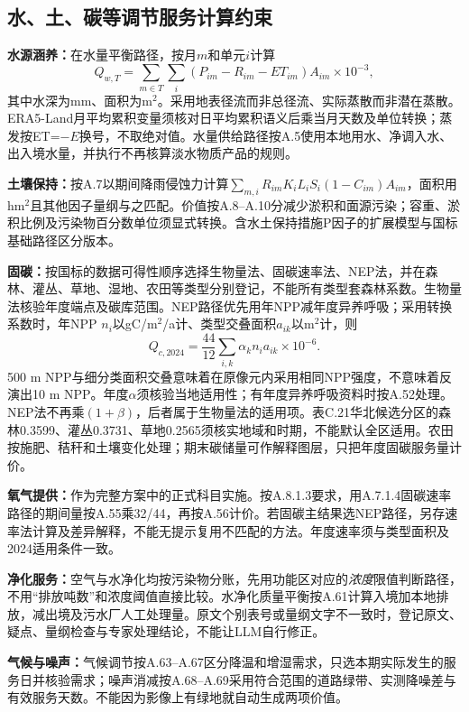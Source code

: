\documentclass[12pt,a4paper,fontset=fandol]{ctexart}
\begin{document}
\subsection{水、土、碳等调节服务计算约束}
\textbf{水源涵养：}在水量平衡路径，按月$m$和单元$i$计算
\begin{equation}
 Q_{w,T}=\sum_{m\in T}\sum_i(P_{im}-R_{im}-ET_{im})A_{im}\times10^{-3},
\end{equation}
其中水深为mm、面积为m$^2$。采用地表径流而非总径流、实际蒸散而非潜在蒸散。ERA5-Land月平均累积变量须核对日平均累积语义后乘当月天数及单位转换；蒸发按ET=$-E$换号，不取绝对值。水量供给路径按A.5使用本地用水、净调入水、出入境水量，并执行不再核算淡水物质产品的规则。

\textbf{土壤保持：}按A.7以期间降雨侵蚀力计算$\sum_{m,i}R_{im}K_iL_iS_i(1-C_{im})A_{im}$，面积用hm$^2$且其他因子量纲与之匹配。价值按A.8--A.10分减少淤积和面源污染；容重、淤积比例及污染物百分数单位须显式转换。含水土保持措施P因子的扩展模型与国标基础路径区分版本。

\textbf{固碳：}按国标的数据可得性顺序选择生物量法、固碳速率法、NEP法，并在森林、灌丛、草地、湿地、农田等类型分别登记，不能所有类型套森林系数。生物量法核验年度端点及碳库范围。NEP路径优先用年NPP减年度异养呼吸；采用转换系数时，年NPP $n_i$以gC/m$^2$/a计、类型交叠面积$a_{ik}$以m$^2$计，则
\begin{equation}
 Q_{c,2024}=\frac{44}{12}\sum_{i,k}\alpha_k n_i a_{ik}\times10^{-6}.
\end{equation}
500 m NPP与细分类面积交叠意味着在原像元内采用相同NPP强度，不意味着反演出10 m NPP。年度$\alpha$须核验当地适用性；有年度异养呼吸资料时按A.52处理。NEP法不再乘$(1+\beta)$，后者属于生物量法的适用项。表C.21华北候选分区的森林0.3599、灌丛0.3731、草地0.2565须核实地域和时期，不能默认全区适用。农田按施肥、秸秆和土壤变化处理；期末碳储量可作解释图层，只把年度固碳服务量计价。

\textbf{氧气提供：}作为完整方案中的正式科目实施。按A.8.1.3要求，用A.7.1.4固碳速率路径的期间量按A.55乘32/44，再按A.56计价。若固碳主结果选NEP路径，另存速率法计算及差异解释，不能无提示复用不匹配的方法。年度速率须与类型面积及2024适用条件一致。

\textbf{净化服务：}空气与水净化均按污染物分账，先用功能区对应的\emph{浓度}限值判断路径，不用“排放吨数”和浓度阈值直接比较。水净化质量平衡按A.61计算入境加本地排放，减出境及污水厂人工处理量。原文个别表号或量纲文字不一致时，登记原文、疑点、量纲检查与专家处理结论，不能让LLM自行修正。

\textbf{气候与噪声：}气候调节按A.63--A.67区分降温和增湿需求，只选本期实际发生的服务日并核验需求；噪声消减按A.68--A.69采用符合范围的道路绿带、实测降噪差与有效服务天数。不能因为影像上有绿地就自动生成两项价值。
\end{document}
